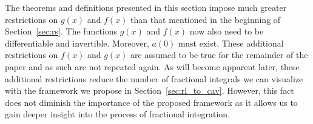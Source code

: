 \documentclass[twoside,reqno,11pt]{fcaa-var} %
\begin{document}
\noindent
The theorems and definitions presented in this section impose much greater restrictions on $g(x)$ and $f(x)$ than that mentioned in the beginning of Section~\ref{sec:rs}. The functions $g(x)$ and $f(x)$ now also need to be differentiable and invertible. Moreover, $a(0)$ must exist. These additional restrictions on $f(x)$ and $g(x)$ are assumed to be true for the remainder of the paper and as such are not repeated again. As will become apparent later, these additional restrictions reduce the number of fractional integrals we can visualize with the framework we propose in Section~\ref{sec:rl_to_cav}. However, this fact does not diminish the importance of the proposed framework as it allows us to gain deeper insight into the process of fractional integration.

\end{document}
